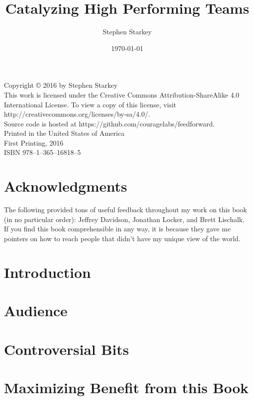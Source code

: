 \documentclass[12pt]{memoir}
\date{\today}
\title{Catalyzing High Performing Teams}
\author{Stephen Starkey}
\begin{document}
\frontmatter

\maketitle

\newpage

\noindent Copyright \copyright{} 2016 by Stephen Starkey \\ 

\noindent This work is licensed under the 
Creative Commons Attribution-ShareAlike 4.0 International License. To view a copy of this license, visit 
http://creativecommons.org/licenses/by-sa/4.0/. \\  

\noindent Source code is hosted at https://github.com/couragelabs/feedforward. \\ 

\noindent Printed in the United States of America \\ 

\noindent First Printing, 2016 \\ 

\noindent ISBN 978--1--365--16818--5

\newpage

\setcounter{secnumdepth}{1}
\setcounter{tocdepth}{1}
\tableofcontents
\newpage
\chapter{Acknowledgments}
The following provided tons of useful feedback throughout my work on this book (in no particular order):
Jeffrey Davidson, Jonathan Locker, and Brett Lischalk. If you find this book comprehensible in any way,
it is because they gave me pointers on how to reach people that didn't have my unique view of the world.

\chapter{Introduction}

\chapter{Audience}

\chapter{Controversial Bits}

\chapter{Maximizing Benefit from this Book}
\end{document}
